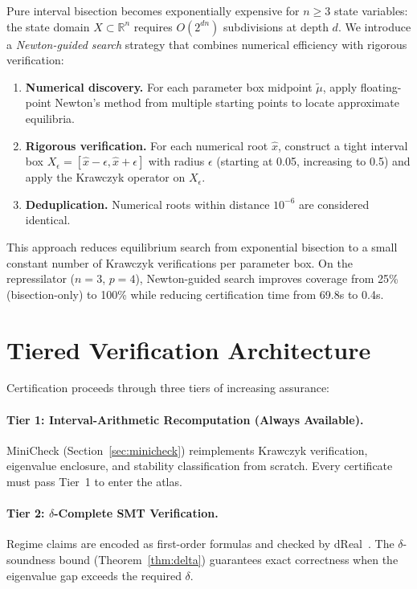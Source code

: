 \documentclass[11pt]{article}
\newcommand{\R}{\mathbb{R}}
\begin{document}
Pure interval bisection becomes exponentially expensive for $n \geq 3$ state variables: the state domain $X \subset \R^n$ requires $O(2^{dn})$ subdivisions at depth $d$.
We introduce a \emph{Newton-guided search} strategy that combines numerical efficiency with rigorous verification:

\begin{enumerate}
\item \textbf{Numerical discovery.} For each parameter box midpoint $\tilde{\mu}$, apply floating-point Newton's method from multiple starting points to locate approximate equilibria.

\item \textbf{Rigorous verification.} For each numerical root $\hat{x}$, construct a tight interval box $X_\epsilon = [\hat{x} - \epsilon, \hat{x} + \epsilon]$ with radius $\epsilon$ (starting at 0.05, increasing to 0.5) and apply the Krawczyk operator on $X_\epsilon$.

\item \textbf{Deduplication.} Numerical roots within distance $10^{-6}$ are considered identical.
\end{enumerate}

This approach reduces equilibrium search from exponential bisection to a small constant number of Krawczyk verifications per parameter box.
On the repressilator ($n{=}3$, $p{=}4$), Newton-guided search improves coverage from 25\% (bisection-only) to 100\% while reducing certification time from 69.8s to 0.4s.

\section{Tiered Verification Architecture}
\label{sec:tiered}

Certification proceeds through three tiers of increasing assurance:

\paragraph{Tier 1: Interval-Arithmetic Recomputation (Always Available).}
MiniCheck (Section~\ref{sec:minicheck}) reimplements Krawczyk verification, eigenvalue enclosure, and stability classification from scratch.
Every certificate must pass Tier~1 to enter the atlas.

\paragraph{Tier 2: $\delta$-Complete SMT Verification.}
Regime claims are encoded as first-order formulas and checked by dReal~\cite{gao2013dreal}.
The $\delta$-soundness bound (Theorem~\ref{thm:delta}) guarantees exact correctness when the eigenvalue gap exceeds the required $\delta$.
\end{document}

